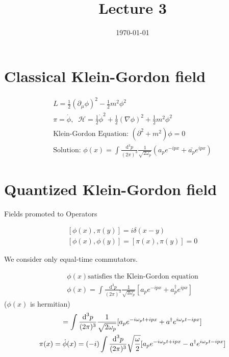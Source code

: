 \documentclass[]{scrartcl}
\title{Lecture 3}
\author{}
\date{\today}
\begin{document}
\maketitle
\newpage
\tableofcontents
\newpage

\section{Classical Klein-Gordon field} 

\begin{gather}
	L = \frac{1}{2}(\partial_\mu\phi)^2 - \frac{1}{2}m^2\phi^2\\
	\pi = \dot\phi, \;\; \mathcal{H} = \frac{1}{2}\dot\phi^2 + \frac{1}{2}(\nabla\phi)^2 + \frac{1}{2}m^2\phi^2\\
	\text{Klein-Gordon Equation: } (\partial^2 + m^2)\phi = 0\\
	\text{Solution: } \phi(x) = \int \frac{\text{d}^3p}{(2\pi)^3} \frac{1}{\sqrt{2\omega_p}}\left(a_p e^{-ipx} + \bar{a_p}e^{ipx}\right)
\end{gather}

\section{Quantized Klein-Gordon field}
Fields promoted to Operators

\begin{gather}
	\left[\phi(x), \pi(y)\right] = i\delta(x-y)\\
	\left[\phi(x), \phi(y)\right] = [\pi(x),\pi(y)] = 0
\end{gather}

We consider only equal-time commutators.

\begin{gather}
	\phi(x) \text{satisfies the Klein-Gordon equation}\\
	\phi(x) = \int\frac{\text{d}^3p}{(2\pi)^3}\frac{1}{\sqrt{2\omega_p}}\left[a_p e^{-ipx} + a_p^\dagger e^{ipx}\right]
\end{gather}
($\phi(x)$ is hermitian)
\begin{gather}
	= \int\frac{\text{d}^3 p}{(2\pi)^3}\frac{1}{\sqrt{2\omega_p}}[a_p e^{-i\omega_p t + ipx} + a^\dagger e^{i\omega_p t - ipx}]\\
	\pi(x) = \dot\phi(x) = (-i)\int\frac{\text d^3p}{(2\pi)^3}\sqrt{\frac{\omega}{2}}[a_p e^{-i\omega_p t + ipx} - a^\dagger e^{i\omega_p t - ipx}]
\end{gather}
\end{document}
